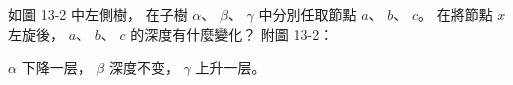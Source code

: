 \startEXERCISE
如圖 13-2 中左側樹，
在子樹 $\alpha$、 $\beta$、 $\gamma$ 中分別任取節點 $a$、 $b$、 $c$。
在將節點 $x$ 左旋後，
 $a$、 $b$、 $c$ 的深度有什麼變化？ 附圖 13-2：

\externalfigure[e13_2_3-1]
\stopEXERCISE

\startANSWER
$\alpha$ 下降一层，
 $\beta$ 深度不变，
 $\gamma$ 上升一层。
\stopANSWER
